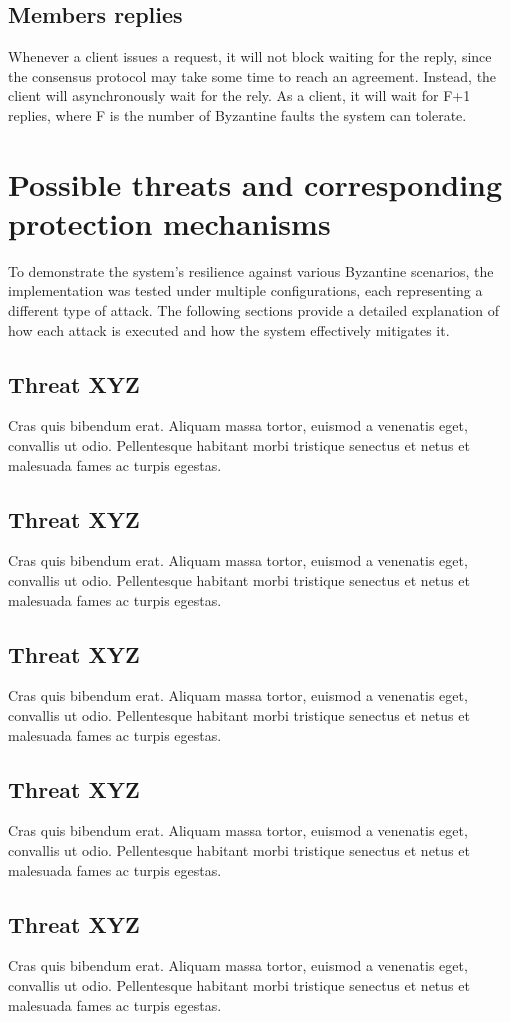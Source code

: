 \documentclass[runningheads]{llncs}
\begin{document}
\subsection{Members replies}
Whenever a client issues a request, it will not block waiting for the reply,
since the consensus protocol may take some time to reach an agreement. Instead,
the client will asynchronously wait for the rely. As a client, it will wait for 
F+1 replies, where F is the number of Byzantine faults the system can tolerate.
%
\section{Possible threats and corresponding protection mechanisms} To
demonstrate the system's resilience against various Byzantine scenarios, the
implementation was tested under multiple configurations, each representing a
different type of attack. The following sections provide a detailed explanation
of how each attack is executed and how the system effectively mitigates it.
\subsection{Threat XYZ}
Cras quis bibendum erat. Aliquam massa tortor, euismod a venenatis eget,
convallis ut odio. Pellentesque habitant morbi tristique senectus et netus et
malesuada fames ac turpis egestas.
%
\subsection{Threat XYZ}
Cras quis bibendum erat. Aliquam massa tortor, euismod a venenatis eget,
convallis ut odio. Pellentesque habitant morbi tristique senectus et netus et
malesuada fames ac turpis egestas.
%
\subsection{Threat XYZ}
Cras quis bibendum erat. Aliquam massa tortor, euismod a venenatis eget,
convallis ut odio. Pellentesque habitant morbi tristique senectus et netus et
malesuada fames ac turpis egestas.
%
\subsection{Threat XYZ}
Cras quis bibendum erat. Aliquam massa tortor, euismod a venenatis eget,
convallis ut odio. Pellentesque habitant morbi tristique senectus et netus et
malesuada fames ac turpis egestas.
%
\subsection{Threat XYZ}
Cras quis bibendum erat. Aliquam massa tortor, euismod a venenatis eget,
convallis ut odio. Pellentesque habitant morbi tristique senectus et netus et
malesuada fames ac turpis egestas.
%
\end{document}
